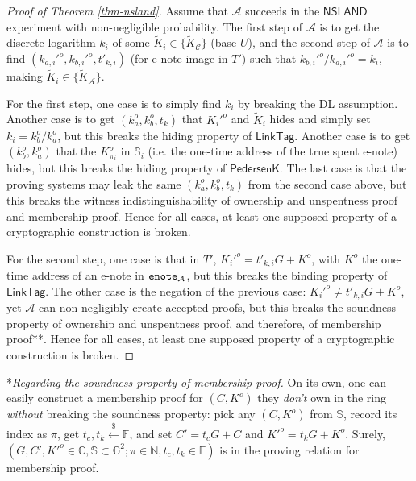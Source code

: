 \documentclass{article}
\theoremstyle{plain}
\theoremstyle{remark}
\begin{document}
\begin{proof}[Proof of Theorem \ref{thm-nsland}]
Assume that $\mathcal{A}$ succeeds in the $\textsf{NSLAND}$ experiment with non-negligible probability. The first step of $\mathcal{A}$ is to get the discrete logarithm $k_i$ of some $\tilde{K}_i \in \{\tilde{K}_{\mathcal{C}}\}$ (base $U$), and the second step of $\mathcal{A}$ is to find $(k_{a,i}'^o, k_{b,i}'^o, t'_{k,i})$ (for e-note image in $T'$) such that $k_{b,i}'^o/k_{a,i}'^o = k_i$, making $\tilde{K}_i \in \{\tilde{K}_{\mathcal{A}}\}$.

For the first step, one case is to simply find $k_i$ by breaking the DL assumption. Another case is to get $(k_a^o, k_b^o, t_k)$ that $K_i'^o$ and $\tilde{K}_i$ hides and simply set $k_i = k_b^o / k_a^o$, but this breaks the hiding property of $\textsf{LinkTag}$. Another case is to get $(k_b^o, k_a^o)$ that the $K_{\pi_i}^o$ in $\mathbb{S}_i$ (i.e. the one-time address of the true spent e-note) hides, but this breaks the hiding property of $\textsf{PedersenK}$. The last case is that the proving systems may leak the same $(k_a^o, k_b^o, t_k)$ from the second case above, but this breaks the witness indistinguishability of ownership and unspentness proof and membership proof. Hence for all cases, at least one supposed property of a cryptographic construction is broken.

For the second step, one case is that in $T'$, $K_i'^o = t'_{k,i} G+ K^o$, with $K^o$ the one-time address of an e-note in ${\tt enote}_{\mathcal{A}}$, but this breaks the binding property of $\textsf{LinkTag}$. The other case is the negation of the previous case: $K_i'^o \ne t'_{k,i} G+ K^o$, yet $\mathcal{A}$ can non-negligibly create accepted proofs, but this breaks the soundness property of ownership and unspentness proof, and therefore, of membership proof**. Hence for all cases, at least one supposed property of a cryptographic construction is broken.
\end{proof}

\noindent **\textit{Regarding the soundness property of membership proof.} On its own, one can easily construct a membership proof for $(C, K^o)$ they \textit{don't} own in the ring \textit{without} breaking the soundness property: pick any $(C, K^o)$ from $\mathbb{S}$, record its index as $\pi$, get $t_c, t_k \xleftarrow{\$}\mathbb{F}$, and set $C' = t_c G + C$ and $K'^o = t_k G + K^o$. Surely, $(G, C', K'^o \in\mathbb{G}, \mathbb{S}\subset\mathbb{G}^2; \pi\in\mathbb{N}, t_c, t_k\in\mathbb{F})$ is in the proving relation for membership proof.
\end{document}
